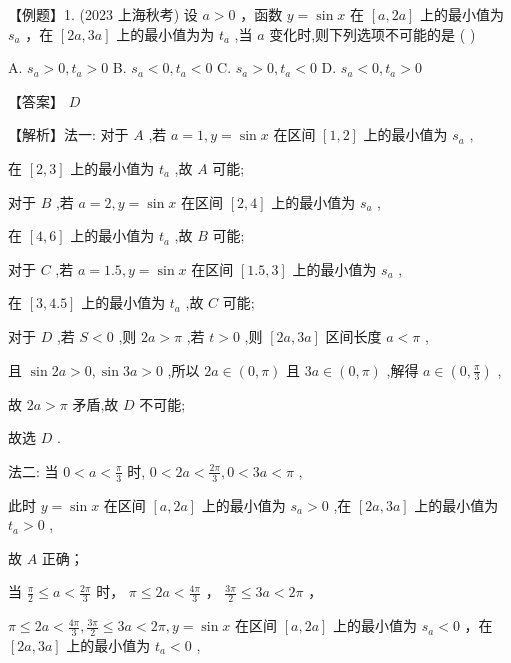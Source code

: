 \documentclass[10pt]{article}
\newcommand*\circled[1]{\tikz[baseline=(char.base)]{\node[shape=circle,draw,inner sep=1.5pt] (char) {\small #1};}}
\begin{document}
【例题】1. (2023 上海秋考) 设 \(a > 0\) ，函数 \(y = \sin x\) 在 \(\left\lbrack  {a,{2a}}\right\rbrack\) 上的最小值为 \({s}_{a}\) ，在 \(\left\lbrack  {{2a},{3a}}\right\rbrack\) 上的最小值为为 \({t}_{a}\) ,当 \(a\) 变化时,则下列选项不可能的是 ( )

A. \({s}_{a} > 0,{t}_{a} > 0\) B. \({s}_{a} < 0,{t}_{a} < 0\) C. \({s}_{a} > 0,{t}_{a} < 0\) D. \({s}_{a} < 0,{t}_{a} > 0\)

【答案】 \(D\)

【解析】法一: 对于 \(A\) ,若 \(a = 1,y = \sin x\) 在区间 \(\left\lbrack  {1,2}\right\rbrack\) 上的最小值为 \({s}_{a}\) ,

在 \(\left\lbrack  {2,3}\right\rbrack\) 上的最小值为 \({t}_{a}\) ,故 \(A\) 可能;

对于 \(B\) ,若 \(a = 2,y = \sin x\) 在区间 \(\left\lbrack  {2,4}\right\rbrack\) 上的最小值为 \({s}_{a}\) ,

在 \(\left\lbrack  {4,6}\right\rbrack\) 上的最小值为 \({t}_{a}\) ,故 \(B\) 可能;

对于 \(C\) ,若 \(a = {1.5},y = \sin x\) 在区间 \(\left\lbrack  {{1.5},3}\right\rbrack\) 上的最小值为 \({s}_{a}\) ,

在 \(\left\lbrack  {3,{4.5}}\right\rbrack\) 上的最小值为 \({t}_{a}\) ,故 \(C\) 可能;

对于 \(D\) ,若 \(S < 0\) ,则 \({2a} > \pi\) ,若 \(t > 0\) ,则 \(\left\lbrack  {{2a},{3a}}\right\rbrack\) 区间长度 \(a < \pi\) ,

且 \(\sin {2a} > 0,\sin {3a} > 0\) ,所以 \({2a} \in  \left( {0,\pi }\right)\) 且 \({3a} \in  \left( {0,\pi }\right)\) ,解得 \(a \in  \left( {0,\frac{\pi }{3}}\right)\) ,

故 \({2a} > \pi\) 矛盾,故 \(D\) 不可能;

故选 \(D\) .

法二:  \circled{1}  当 \(0 < a < \frac{\pi }{3}\) 时, \(0 < {2a} < \frac{2\pi }{3},0 < {3a} < \pi\) ,

此时 \(y = \sin x\) 在区间 \(\left\lbrack  {a,{2a}}\right\rbrack\) 上的最小值为 \({s}_{a} > 0\) ,在 \(\left\lbrack  {{2a},{3a}}\right\rbrack\) 上的最小值为 \({t}_{a} > 0\) ,

故 \(A\) 正确；

 \circled{2}  当 \(\frac{\pi }{2} \leq  a < \frac{2\pi }{3}\) 时， \(\pi  \leq  {2a} < \frac{4\pi }{3}\) ， \(\frac{3\pi }{2} \leq  {3a} < {2\pi }\) ，

\(\pi  \leq  {2a} < \frac{4\pi }{3},\frac{3\pi }{2} \leq  {3a} < {2\pi },y = \sin x\) 在区间 \(\left\lbrack  {a,{2a}}\right\rbrack\) 上的最小值为 \({s}_{a} < 0\) ，在 \(\left\lbrack  {{2a},{3a}}\right\rbrack\) 上的最小值为 \({t}_{a} < 0\) ,
\end{document}
